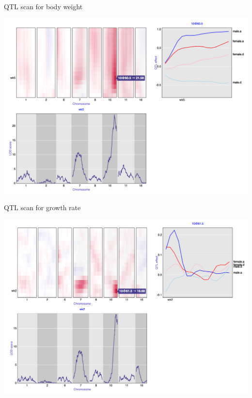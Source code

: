 \documentclass[12pt]{article}
\newcommand{\headsize}{\fontsize{35}{35} \selectfont}
\begin{document}
\newpage

\headsize \color{myyellow}
\hfill \begin{minipage}{5.75in}
\centering
QTL scan for body weight
\end{minipage}

\vspace{5mm}

\centerline{\href{https://www.biostat.wisc.edu/~kbroman/presentations/CTC2014/iplot_bodyweight.html}{\includegraphics[height=0.9\textheight]{Figs/iplot_bodyweight.png}}}




\newpage

\headsize \color{myyellow}
\hfill \begin{minipage}{5.75in}
\centering
QTL scan for growth rate
\end{minipage}

\vspace{5mm}

\centerline{\href{https://www.biostat.wisc.edu/~kbroman/presentations/CTC2014/iplot_deriv_bodyweight.html}{\includegraphics[height=0.9\textheight]{Figs/iplot_deriv_bodyweight.png}}}
\end{document}
